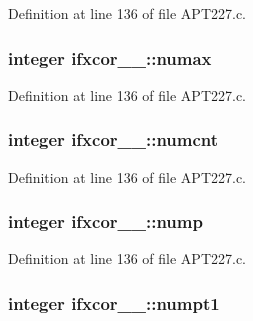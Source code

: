 Definition at line 136 of file A\+P\+T227.\+c.

\subsubsection[{\texorpdfstring{numax}{numax}}]{\setlength{\rightskip}{0pt plus 5cm}integer ifxcor\+\_\+\_\+\+::numax}\hypertarget{structifxcor__1___adaa02046d81d26baacca99777ef002a8}{}\label{structifxcor__1___adaa02046d81d26baacca99777ef002a8}


Definition at line 136 of file A\+P\+T227.\+c.

\subsubsection[{\texorpdfstring{numcnt}{numcnt}}]{\setlength{\rightskip}{0pt plus 5cm}integer ifxcor\+\_\+\_\+\+::numcnt}\hypertarget{structifxcor__1___a92d3e63778ade72ee5ae9a99852a37d4}{}\label{structifxcor__1___a92d3e63778ade72ee5ae9a99852a37d4}


Definition at line 136 of file A\+P\+T227.\+c.

\subsubsection[{\texorpdfstring{nump}{nump}}]{\setlength{\rightskip}{0pt plus 5cm}integer ifxcor\+\_\+\_\+\+::nump}\hypertarget{structifxcor__1___a77336be392ffb1e9bde5105d66d83cd5}{}\label{structifxcor__1___a77336be392ffb1e9bde5105d66d83cd5}


Definition at line 136 of file A\+P\+T227.\+c.

\subsubsection[{\texorpdfstring{numpt1}{numpt1}}]{\setlength{\rightskip}{0pt plus 5cm}integer ifxcor\+\_\+\_\+\+::numpt1}\hypertarget{structifxcor__1___af05001c9c777c699d6c58201751af18e}{}\label{structifxcor__1___af05001c9c777c699d6c58201751af18e}


